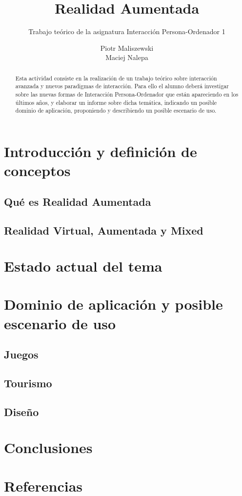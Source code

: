 \documentclass[a4paper,11pt]{scrartcl}
\title{Realidad Aumentada}
\subtitle{Trabajo teórico de la asignatura Interacción Persona-Ordenador 1}
\author{Piotr Maliszewski\\Maciej Nalepa}
\begin{document}
\maketitle

\begin{abstract}

Esta actividad consiste en la realización de un trabajo teórico sobre interacción avanzada y
nuevos paradigmas de interacción. Para ello el alumno deberá investigar sobre las nuevas
formas de Interacción Persona-Ordenador que están apareciendo en los últimos años, y elaborar un
informe sobre dicha temática, indicando un posible dominio de aplicación, proponiendo y
describiendo un posible escenario de uso.

\end{abstract}

\section{Introducción y definición de conceptos}
\subsection{Qué es Realidad Aumentada}
\subsection{Realidad Virtual, Aumentada y Mixed}

\section{Estado actual del tema}

\section{Dominio de aplicación y posible escenario de uso}
\subsection{Juegos}
\subsection{Tourismo}
\subsection{Diseño}

\section{Conclusiones}

\section{Referencias}
\end{document}
